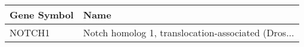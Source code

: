 \begin{tabular}{ll}
\toprule
Gene Symbol &                                               Name \\
\midrule
     NOTCH1 & Notch homolog 1, translocation-associated (Dros... \\
\bottomrule
\end{tabular}

